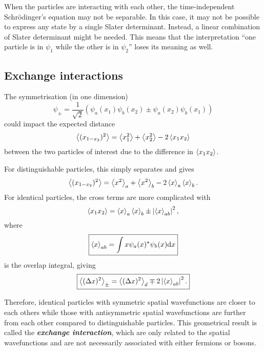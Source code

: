 \documentclass{article}
\theoremstyle{nonumberplain}
\begin{document}
When the particles are interacting with each other, the time-independent Schrödinger's equation may not be separable. In this case, it may not be possible to express any state by a single Slater determinant. Instead, a linear combination of Slater determinant might be needed. This means that the interpretation ``one particle is in $\psi_1$ while the other is in $\psi_2$'' loses its meaning as well. 
\subsection{Exchange interactions}
The symmetrisation (in one dimension)
\[
    \psi_{\pm} = \frac{1}{\sqrt{2} } \left( 
        \psi_a(x_1) \psi_b(x_2) \pm \psi_a(x_2) \psi_b(x_1)
    \right)
\]
could impact the expected distance 
\[
    \expval{(x_{1-x_2} )^{2} } = \expval{x_1^2} + \expval{x_2^2} - 2 \expval{x_1 x_2} 
\]
between the two particles of interest due to the difference in $\expval{x_1 x_2}$. 

For distinguishable particles, this simply separates and gives 
\[
    \expval{(x_{1-x_2} )^{2} } = \expval{x^2}_a + \expval{x^2}_b - 2 \expval{x}_a \expval{x}_b.   
\]
For identical particles, the cross terms are more complicated with 
\[
    \expval{x_1 x_2} = \expval{x}_a \expval{x}_b \pm \left\vert \expval{x}_{ab} \right\vert ^{2},
\]
where 
\begin{equation}
    \label{eq:overlap-integral}
    \boxed{
    \expval{x}_{ab} = \int x \psi_a(x)^{\star} \psi_b(x) \mathrm{d} x}
\end{equation}
is the overlap integral, giving 
\[
    \boxed{ 
        \expval{(\Delta x)^{2} }_{\pm} = \expval{(\Delta x)^{2} }_d \mp 2 \left\vert \expval{x}_{ab} \right\vert ^{2}.
    }
\]

Therefore, identical particles with symmetric spatial wavefunctions are closer to each others while those with antisymmetric spatial wavefunctions are further from each other compared to distinguishable particles. This geometrical result is called the \textit{\textbf{exchange interaction}}, which are only related to the spatial wavefunctions and are not necessarily associated with either fermions or bosons. 
\end{document}
